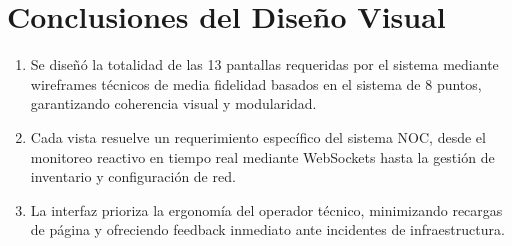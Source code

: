 \documentclass[12pt,a4paper]{report}
\begin{document}
\section{Conclusiones del Diseño Visual}

\begin{enumerate}
  \item Se diseñó la totalidad de las 13 pantallas requeridas por el sistema mediante wireframes técnicos de media fidelidad basados en el sistema de 8 puntos, garantizando coherencia visual y modularidad.
  \item Cada vista resuelve un requerimiento específico del sistema NOC, desde el monitoreo reactivo en tiempo real mediante WebSockets hasta la gestión de inventario y configuración de red.
  \item La interfaz prioriza la ergonomía del operador técnico, minimizando recargas de página y ofreciendo feedback inmediato ante incidentes de infraestructura.
\end{enumerate}
\end{document}
